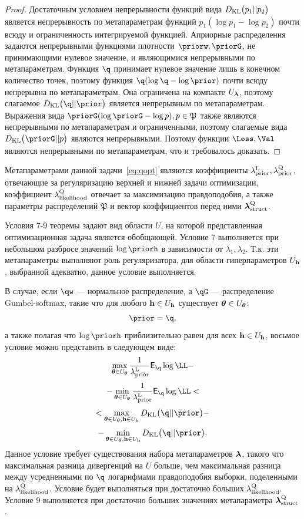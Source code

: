 \begin{proof}
Достаточным условием непрерывности функций вида $D_\text{KL}\bigl(p_1 || p_2\bigr)$ является непрерывность по метапараметрам функций $p_1 (\log{p_1} - \log{p_2})$  почти всюду и ограниченность интегрируемой функцией.  Априорные распределения задаются непрерывными функциями плотности $\priorw, \priorG$, не принимающими нулевое значение, и являющимися непрерывными по метапараметрам. Функция $\q$ принимает нулевое значение лишь в конечном количество точек, поэтому функция $\q (\log \q - \log \prior)$ почти всюду непрерывна по метапараметрам.  Она ограничена на компакте $U_{\boldsymbol{\lambda}}$, поэтому слагаемое $\KL{\q}{\prior}$ является непрерывным по метапараметрам.
Выражения вида $\priorG (\log \priorG - \log p), p \in \mathfrak{P}$ также являются непрерывными по метапараметрам и ограниченными, поэтому слагаемые вида $\KL{\priorG}{p}$ являются непрерывными. Поэтому функции $\Loss, \Val$ являются непрерывными по метапараметрам, что и требовалось доказать.
\end{proof}
Метапараметрами данной задачи~\eqref{eq:qopt} являются коэффициенты $\lambda_\text{prior}^\text{L}, \lambda_\text{prior}^\text{Q}$, отвечающие за регуляризацию верхней и нижней задачи оптимизации, коэффициент $\lambda_\text{likelihood}^\text{Q}$ отвечает за максимизацию правдоподобия, а также параметры распределений $\mathfrak{P}$ и вектор коэффициентов перед ними $\boldsymbol{\lambda}_\text{struct}^\text{Q}$. 

Условия 7-9 теоремы задают вид области $U$, на которой представленная оптимизационная задача является обобщающей. 
Условие 7 выполняется при небольшом разбросе значений $\log \priorh$ в зависимости от $\lambda_1, \lambda_2$. Т.к. эти метапараметры выполняют роль регуляризатора, для области гиперпараметров $U_{\mathbf{h}}$, выбранной адекватно, данное условие выполняется.

В случае, если $\qw$ --- нормальное распределение, а $\qG$ --- распределение Gumbel-softmax, такие что для любого $\mathbf{h} \in U_{\mathbf{h}}$ существует $\boldsymbol{\theta} \in U_{\boldsymbol{\theta}}$:
\[
    \prior = \q,
\]
а также полагая что $\log\priorh$ приблизительно равен для всех $\mathbf{h} \in U_{\mathbf{h}}$, восьмое условие можно представить в следующем виде:
\[
\max_{\teta \in \Uteta}\frac{1}{\lamCL}\E_{\q} \log \LL - 
\]
\[
 - \min_{\teta \in \Uteta}\frac{1}{\lamCL}\E_{\q} \log \LL  <
\]
\[ 
< \max_{\teta \in \Uteta, \h \in \Uh} \KL{\q}{\prior} -
\]
\[
-\min_{\teta \in \Uteta, \h \in \Uh} \KL{\q}{\prior}.
\]
Данное условие требует существования набора метапараметров $\boldsymbol{\lambda}$, такого что максимальная разница дивергенций на $U$ больше, чем максимальная разница между усредненными по $\q$ логарифмами правдоподобия выборки, поделенными на $\lambda_\text{likelihood}^\text{Q}$. Условие будет выполняться при достаточно больших $\lambda_\text{likelihood}^\text{Q}.$
Условие 9 выполняется при достаточно больших значениях метапараметра $\boldsymbol{\lambda}_\text{struct}^\text{Q}$. 




